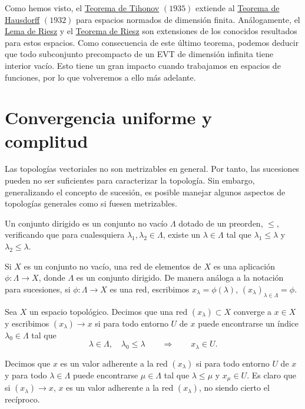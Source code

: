 Como hemos visto, el \hyperref[thm:d05]{Teorema de Tihonov} $(1935)$ extiende al \hyperref[thm:h01]{Teorema de Hausdorff} $(1932)$ para espacios normados de dimensión finita. Análogamente, el \hyperref[lm:d01]{Lema de Riesz} y el \hyperref[thm:d04]{Teorema de Riesz} son extensiones de los conocidos resultados para estos espacios. Como consecuencia de este último teorema, podemos deducir que todo subconjunto precompacto de un EVT de dimensión infinita tiene interior vacío. Esto tiene un gran impacto cuando trabajamos en espacios de funciones, por lo que volveremos a ello más adelante. 

\section{Convergencia uniforme y complitud}
Las topologías vectoriales no son metrizables en general. Por tanto, las sucesiones pueden no ser suficientes para caracterizar la topología. Sin embargo, generalizando el concepto de sucesión, es posible manejar algunos aspectos de topologías generales como si fuesen metrizables. 

\begin{definicion}
Un conjunto dirigido es un conjunto no vacío $\Lambda$ dotado de un preorden, $\leq$, verificando que para cualesquiera $\lambda_{1},\lambda_{2}\in\Lambda$, existe un $\lambda\in\Lambda$ tal que $\lambda_{1}\leq\lambda$ y $\lambda_{2}\leq\lambda$.

Si $X$ es un conjunto no vacío, una red de elementos de $X$ es una aplicación $\phi : \Lambda \rightarrow X$, donde $\Lambda$ es un conjunto dirigido. De manera análoga a la notación para sucesiones, si $\phi: \Lambda \rightarrow X$ es una red, escribimos $x_{\lambda} = \phi(\lambda)$, $(x_{\lambda})_{\lambda\in\Lambda} = \phi$. 
\end{definicion}

\begin{definicion}
Sea $X$ un espacio topológico. Decimos que una red $(x_{\lambda})\subset X$ converge a $x\in X$ y escribimos $(x_{\lambda}) \rightarrow x$ si para todo entorno $U$ de $x$ puede encontrarse un índice $\lambda_{0}\in\Lambda$ tal que 
\begin{equation}
\lambda\in\Lambda, \quad \lambda_{0}\leq\lambda \qquad \Rightarrow \qquad  x_{\lambda}\in U.
\end{equation}
\end{definicion}

\begin{definicion}
Decimos que $x$ es un valor adherente a la red $(x_\lambda)$ si para todo entorno $U$ de $x$ y para todo $\lambda\in\Lambda$ puede encontrarse $\mu \in \Lambda$ tal que $\lambda\leq\mu$ y $x_{\mu}\in U$. Es claro que si $(x_{\lambda}) \rightarrow x$,
$x$ es un valor adherente a la red $(x_{\lambda})$, no siendo cierto el recíproco.
\end{definicion}

